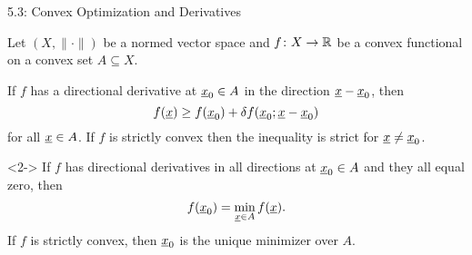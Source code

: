 \documentclass[10pt,english,aspectratio=169]{beamer}
\begin{document}
\begin{frame}{5.3: Convex Optimization and Derivatives}

\begin{minipage}{0.55\textwidth}
Let $(X,\|\cdot\|)$ be a normed vector space and $f \colon X \rightarrow \mathbb{R}$ be a convex functional on a convex set $A \subseteq X$.
\end{minipage}
\begin{minipage}{0.44\textwidth}\hspace{3mm}
\end{minipage}

\begin{theorem}
If $f$ has a directional derivative  at $\underline{x}_0 \in A$ in the direction $\underline{x}-\underline{x}_0$, then \vspace{-1mm}
\[ f(\vecnot{x}) \geq f(\vecnot{x}_0) + \delta f (\vecnot{x}_0;\vecnot{x}-\vecnot{x}_0) %
\vspace{-1mm} \]
for all $\underline{x}\in A$.
If $f$ is strictly convex then the inequality is strict for $\underline{x}\neq \underline{x}_0$.
\end{theorem}

\vspace{1mm}

\begin{corollary}<2->
If $f$ has directional derivatives in all directions at $\underline{x}_0 \in A$ and they all equal zero, then \vspace{-2mm}
\[ f(\vecnot{x}_0) = \min_{\vecnot{x}\in A} f(\vecnot{x}). \vspace{-2mm} \]
If $f$ is strictly convex, then $\underline{x}_0$ is the unique minimizer over $A$.
\end{corollary}


\end{frame}
\end{document}
